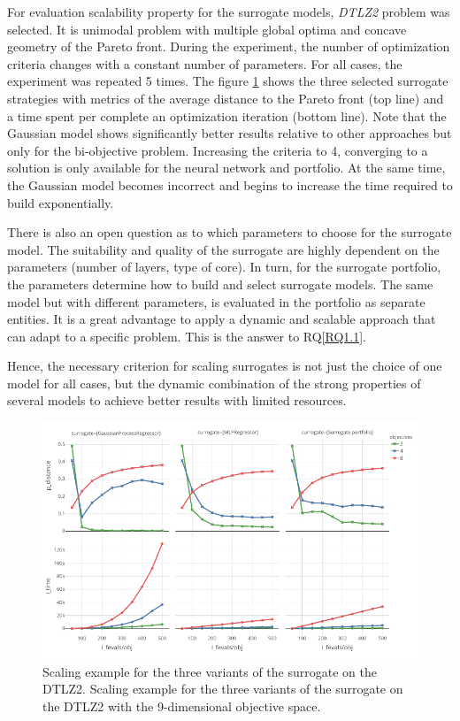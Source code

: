     For evaluation scalability property for the surrogate models, \emph{DTLZ2} problem was selected. It is unimodal problem with multiple global optima and concave geometry of the Pareto front. During the experiment, the number of optimization criteria changes with a constant number of parameters. For all cases, the experiment was repeated 5 times. The figure \ref{fig:scale_dtlz2} shows the three selected surrogate strategies with metrics of the average distance to the Pareto front (top line) and a time spent per complete an optimization iteration (bottom line). Note that the Gaussian model shows significantly better results relative to other approaches but only for the bi-objective problem. Increasing the criteria to 4, converging to a solution is only available for the neural network and portfolio. At the same time, the Gaussian model becomes incorrect and begins to increase the time required to build exponentially.
    
    There is also an open question as to which parameters to choose for the surrogate model. The suitability and quality of the surrogate are highly dependent on the parameters (number of layers, type of core). In turn, for the surrogate portfolio, the parameters determine how to build and select surrogate models. The same model but with different parameters, is evaluated in the portfolio as separate entities. It is a great advantage to apply a dynamic and scalable approach that can adapt to a specific problem. This is the answer to RQ\ref{RQ1.1}.

    
    Hence, the necessary criterion for scaling surrogates is not just the choice of one model for all cases, but the dynamic combination of the strong properties of several models to achieve better results with limited resources.


    \begin{figure}
        \centering
        \includegraphics[width=\textwidth]{content/images/scale_dtlz2}
        \caption[Scaling example for the three variants of the surrogate on the DTLZ2.]{Scaling example for the three variants of the surrogate on the DTLZ2. Scaling example for the three variants of the surrogate on the DTLZ2  with the 9-dimensional objective space.}
        \label{fig:scale_dtlz2}    
    \end{figure}



